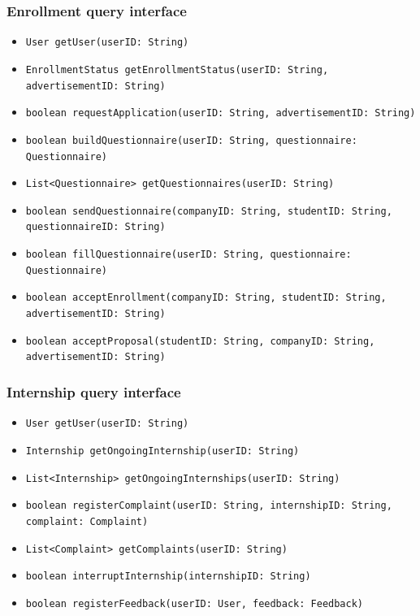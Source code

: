 \subsubsection{Enrollment query interface}
\begin{itemize}
    \item \verb|User getUser(userID: String)|
    \item \verb|EnrollmentStatus getEnrollmentStatus(userID: String, | \\ \makebox[10em][l]{} \verb|advertisementID: String)|
    \item \verb|boolean requestApplication(userID: String, advertisementID: String)|
    \item \verb|boolean buildQuestionnaire(userID: String, questionnaire: Questionnaire)|
    \item \verb|List<Questionnaire> getQuestionnaires(userID: String)|
    \item \verb|boolean sendQuestionnaire(companyID: String, studentID: String, | \\ \makebox[10em][l]{} \verb|questionnaireID: String)|
    \item \verb|boolean fillQuestionnaire(userID: String, questionnaire: Questionnaire)|
    \item \verb|boolean acceptEnrollment(companyID: String, studentID: String, | \\ \makebox[10em][l]{} \verb|advertisementID: String)|
    \item \verb|boolean acceptProposal(studentID: String, companyID: String, | \\ \makebox[10em][l]{} \verb|advertisementID: String)|
\end{itemize}

\subsubsection{Internship query interface}
\begin{itemize}
    \item \verb|User getUser(userID: String)|
    \item \verb|Internship getOngoingInternship(userID: String)|
    \item \verb|List<Internship> getOngoingInternships(userID: String)|
    \item \verb|boolean registerComplaint(userID: String, internshipID: String, | \\ \makebox[10em][l]{} \verb|complaint: Complaint)|
    \item \verb|List<Complaint> getComplaints(userID: String)|
    \item \verb|boolean interruptInternship(internshipID: String)|
    \item \verb|boolean registerFeedback(userID: User, feedback: Feedback)|
\end{itemize}

